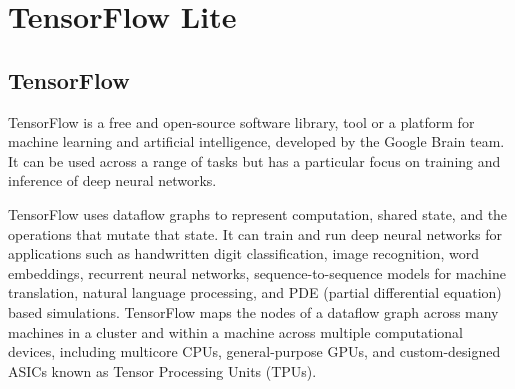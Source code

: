 
%
%
%
%

\chapter{TensorFlow Lite}

\section{TensorFlow}
\label{sec:Tensor_Flow}

TensorFlow is a free and open-source software library, tool or a platform for machine learning and artificial intelligence, developed by the Google Brain team. It can be used across a range of tasks but has a particular focus on training and inference of deep neural networks.  \cite{tensorflowWiki:2024}

TensorFlow uses dataflow graphs to represent computation, shared state, and the operations that mutate that state. It can train and run deep neural networks for applications such as handwritten digit classification, image recognition, word embeddings, recurrent neural networks, sequence-to-sequence models for machine translation, natural language processing, and PDE (partial differential equation) based simulations. TensorFlow maps the nodes of a dataflow graph across many machines in a cluster and within a machine across multiple computational devices, including multicore CPUs, general-purpose GPUs, and custom-designed ASICs known as Tensor Processing Units (TPUs). \cite{tensorflow:2024} \cite{abadi2016tensorflow}

